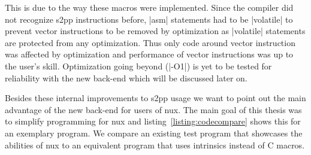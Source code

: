 This is due to the way these macros were implemented.
Since the compiler did not recognize s2pp instructions before, |asm| statements had to be |volatile| to prevent vector instructions to be removed by optimization as |volatile| statements are protected from any optimization.
Thus only code around vector instruction was affected by optimization and performance of vector instructions was up to the user's skill.
Optimization going beyond (|-O1|) is yet to be tested for reliability with the new back-end which will be discussed later on.

Besides these internal improvements to s2pp usage we want to point out the main advantage of the new back-end for users of nux.
The main goal of this thesis was to simplify programming for nux and listing~\ref{listing:codecompare} shows this for an exemplary program.
We compare an existing test program that showcases the abilities of nux to an equivalent program that uses intrinsics instead of C macros.




